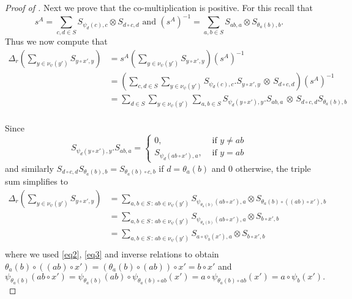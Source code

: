 \documentclass[a4paper,10pt]{amsart}
\theoremstyle{definition}
\theoremstyle{remark}
\newcommand\D{\Delta}
\newcommand\ot{\otimes}
\begin{document}
\begin{proof}[Proof of ]
Next we prove that the co-multiplication is positive. For this recall that $$s^{A} = \sum\limits_{c,d\in S} S_{\psi_d(c), c}\otimes S_{d \circ c,d} \text{ and } (s^{A})^{-1} = \sum\limits_{a,b\in S} S_{ab, a}\otimes S_{\theta_a(b),b}. $$
Thus we now compute that
\begin{align*}
\D_r(\sum_{y\in \nu_{\psi}(y')}S_{y\circ x',y}) & = s^{A} (\sum_{y\in \nu_{\psi}(y')}S_{y\circ x',y}) (s^{A})^{-1} \\
& = \left( \sum_{c,d\in S}\sum_{y \in \nu_{\psi}(y')} S_{\psi_d(c),c}.S_{y\circ x',y} \,\ot \, S_{d\circ c,d} \right) (s^{A})^{-1}\\
& = \sum_{d \in S} \sum_{y \in \nu_{\psi}(y')}  \sum_{a,b\in S} S_{\psi_d(y\circ x'), y} . S_{ab,a} \, \ot \, S_{d\circ c,d}S_{\theta_a(b),b} \\
\end{align*}

Since 
$$S_{\psi_d(y\circ x'), y} . S_{ab,a} = \left\{ \begin{array}{ll}
0, & \text{ if } y \neq ab\\
S_{\psi_d(ab \circ x'),a}, &\text{ if } y = ab
\end{array}\right.$$
and similarly $ S_{d\circ c,d}S_{\theta_a(b),b} = S_{\theta_a(b)\circ c, b}$ if $d = \theta_a(b)$ and $0$ otherwise, the triple sum simplifies to
\begin{align*}
\D_r(\sum_{y\in \nu_{\psi}(y')}S_{y\circ x',y}) & = \sum\limits_{a,b\in S \, : \, ab \in \nu_{\psi}(y')} S_{\psi_{\theta_a(b)}(ab \circ x'), a} \ot S_{\theta_a(b) \circ ((ab)\circ x'),b}\\
& = \sum\limits_{a,b\in S \, : \, ab \in \nu_{\psi}(y')} S_{\psi_{\theta_a(b)}(ab \circ x'), a} \ot S_{b\circ x',b} \\
& = \sum\limits_{a,b\in S \, : \, ab \in \nu_{\psi}(y')} S_{a \circ \psi_b(x'), a} \ot S_{b\circ x',b} \\
\end{align*}
where we used \eqref{eq2}, \eqref{eq3} and inverse relations to obtain $\theta_a(b) \circ ((ab)\circ x') = (\theta_a(b) \circ (ab))\circ x' = b \circ x'$ and 
$$\psi_{\theta_a(b)}(ab \circ x') = \psi_{\theta_a(b)}(ab) \circ \psi_{\theta_a(b)\circ ab}(x') = a \circ \psi_{\theta_a(b)\circ ab}(x') =a \circ \psi_b(x').$$


\end{proof}
\end{document}
